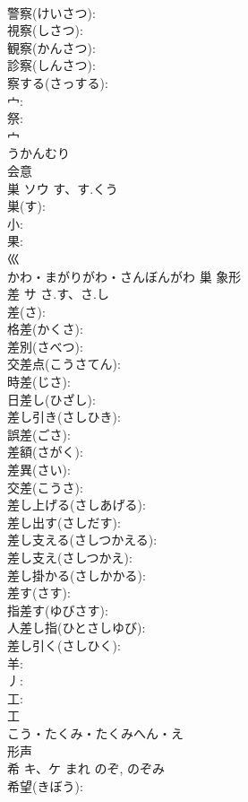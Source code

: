\documentclass[8pt]{extreport}
\begin{document}
\begin{CJK}{UTF8}{min}
\\	警察(けいさつ): 
\\	視察(しさつ): 
\\	観察(かんさつ): 
\\	診察(しんさつ): 
\\	察する(さっする): 
\\	宀: 
\\	祭: 
\\	宀	
\\	うかんむり	
\\	会意 
\\	巣	ソウ	す、す.くう		
\\	巣(す): 
\\	小: 
\\	果: 
\\	巛	
\\	かわ・まがりがわ・さんぼんがわ	巢	象形 
\\	差	サ	さ.す、さ.し		
\\	差(さ): 
\\	格差(かくさ): 
\\	差別(さべつ): 
\\	交差点(こうさてん): 
\\	時差(じさ): 
\\	日差し(ひざし): 
\\	差し引き(さしひき): 
\\	誤差(ごさ): 
\\	差額(さがく): 
\\	差異(さい): 
\\	交差(こうさ): 
\\	差し上げる(さしあげる): 
\\	差し出す(さしだす): 
\\	差し支える(さしつかえる): 
\\	差し支え(さしつかえ): 
\\	差し掛かる(さしかかる): 
\\	差す(さす): 
\\	指差す(ゆびさす): 
\\	人差し指(ひとさしゆび): 
\\	差し引く(さしひく): 
\\	羊: 
\\	丿: 
\\	工: 
\\	工	
\\	こう・たくみ・たくみへん・え	
\\	形声 
\\	希	キ、ケ	まれ	のぞ, のぞみ	
\\	希望(きぼう): 

\end{CJK}
\end{document}
